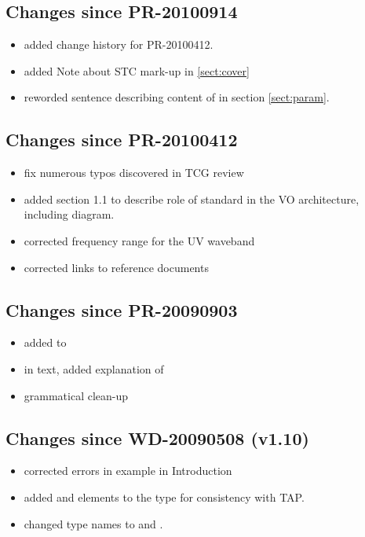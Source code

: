 \documentclass[11pt,a4paper]{ivoa}
\begin{document}
\subsection{Changes since PR-20100914}

\begin{itemize}
  \item added change history for PR-20100412.
  \item added Note about STC mark-up in \ref{sect:cover}
  \item reworded sentence describing content of  in
       section \ref{sect:param}.
\end{itemize}

\subsection{Changes since PR-20100412}

\begin{itemize}
  \item fix numerous typos discovered in TCG review
  \item added section 1.1 to describe role of standard in the VO
       architecture, including diagram.
  \item corrected frequency range for the UV waveband
  \item corrected links to reference documents
\end{itemize}

\subsection{Changes since PR-20090903}

\begin{itemize}
  \item added 
       to 
  \item in text, added explanation of
  \item grammatical clean-up
\end{itemize}

\subsection{Changes since WD-20090508 (v1.10)}

\begin{itemize}
  \item corrected errors in example in Introduction
  \item added  and
        elements to the
        type for consistency with TAP.
  \item changed type names  to
        and 
       .
\end{itemize}


\end{document}
